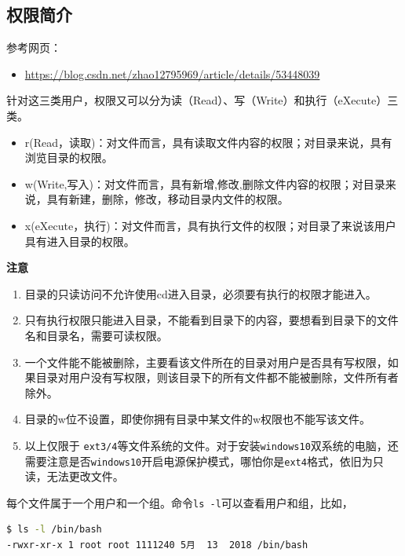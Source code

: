 \documentclass[doctor,openright,twoside]{sjtuthesis}
\providecommand{\tightlist}{%
    \setlength{\itemsep}{0pt}\setlength{\parskip}{0pt}}
\newcommand{\passthrough}[1]{#1}
\theoremstyle{plain}
\theoremstyle{definition}
\theoremstyle{remark}
\theoremstyle{ocrenumbox}
\theoremstyle{plain}
\begin{document}
\hypertarget{section-65}{%
\subsection{权限简介}\label{section-65}}

参考网页：

\begin{itemize}
\tightlist
\item
  \url{https://blog.csdn.net/zhao12795969/article/details/53448039}
\end{itemize}

针对这三类用户，权限又可以分为读（Read）、写（Write）和执行（eXecute）三类。

\begin{itemize}
\tightlist
\item
  r(Read，读取)：对文件而言，具有读取文件内容的权限；对目录来说，具有浏览目录的权限。
\item
  w(Write,写入)：对文件而言，具有新增,修改,删除文件内容的权限；对目录来说，具有新建，删除，修改，移动目录内文件的权限。
\item
  x(eXecute，执行)：对文件而言，具有执行文件的权限；对目录了来说该用户具有进入目录的权限。
\end{itemize}

\textbf{注意}

\begin{enumerate}
\def\labelenumi{\arabic{enumi}.}
\tightlist
\item
  目录的只读访问不允许使用cd进入目录，必须要有执行的权限才能进入。
\item
  只有执行权限只能进入目录，不能看到目录下的内容，要想看到目录下的文件名和目录名，需要可读权限。
\item
  一个文件能不能被删除，主要看该文件所在的目录对用户是否具有写权限，如果目录对用户没有写权限，则该目录下的所有文件都不能被删除，文件所有者除外。
\item
  目录的w位不设置，即使你拥有目录中某文件的w权限也不能写该文件。
\item
  以上仅限于 \passthrough{\lstinline!ext3/4!}等文件系统的文件。对于安装\passthrough{\lstinline!windows10!}双系统的电脑，还需要注意是否\passthrough{\lstinline!windows10!}开启电源保护模式，哪怕你是\passthrough{\lstinline!ext4!}格式，依旧为只读，无法更改文件。
\end{enumerate}

每个文件属于一个用户和一个组。命令\passthrough{\lstinline!ls -l!}可以查看用户和组，比如，

\begin{lstlisting}[language=bash]
$ ls -l /bin/bash 
-rwxr-xr-x 1 root root 1111240 5月  13  2018 /bin/bash
\end{lstlisting}
\end{document}
